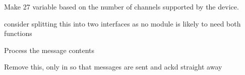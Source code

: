 
\begin{DoxyRefList}
\item[Member \mbox{\hyperlink{class_ads1299_low_driver_aeef277492407cca99e3d839bb7f11a55}{Ads1299\+Low\+Driver\+::Get\+Ads1299\+Data}} (void)]\label{todo__todo000002}%
%
Make 27 variable based on the number of channels supported by the device.  
\item[Member \mbox{\hyperlink{class_i_pc_communications_a7a215500285af53b86503308754eec18}{IPc\+Communications\+::Get\+Received\+Bytes}} (uint8\+\_\+t data\mbox{[}\mbox{]}, uint8\+\_\+t max\+\_\+length)=0]\label{todo__todo000003}%
%
consider splitting this into two interfaces as no module is likely to need both functions  
\item[Member \mbox{\hyperlink{class_protocol_receiver_abc474ba439dcc4a299e95d8b17a2a06a}{Protocol\+Receiver\+::Rx\+State\+\_\+\+Get\+Payload\+And\+Process\+Message\+Contents}} (uint8\+\_\+t c, s\+Rx\+Struct state, \mbox{\hyperlink{class_protocol_receiver}{Protocol\+Receiver}} $\ast$protocol\+Receiver)]\label{todo__todo000004}%
%
Process the message contents  
\item[Member \mbox{\hyperlink{class_protocol_transmitter_a45273aa587b61d98115a6d3e1c6b636b}{Protocol\+Transmitter\+::Process\+Event}} (NEvent\+::e\+Event event) override]\label{todo__todo000005}%
%
Remove this, only in so that messages are sent and ack\textquotesingle{}d straight away 
\end{DoxyRefList}